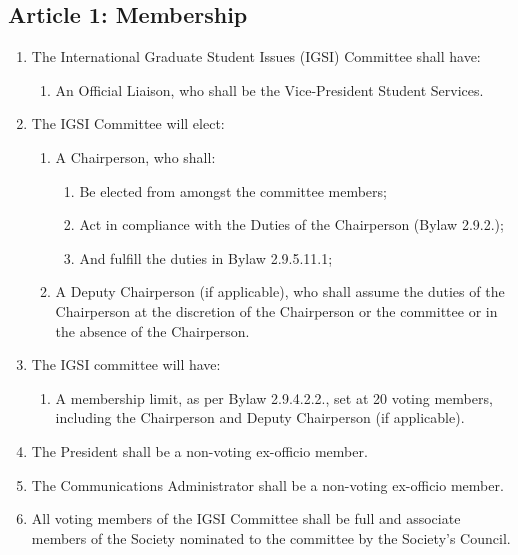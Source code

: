 \subsection{Article 1: Membership}
\begin{enumerate}[label*=\arabic*., align=left]	
\item The International Graduate Student Issues (IGSI) Committee shall have:
\begin{enumerate}[label*=\arabic*., align=left]	
\item An Official Liaison, who shall be the Vice-President Student Services.
\end{enumerate}
\item The IGSI Committee will elect:
\begin{enumerate}[label*=\arabic*., align=left]
\item A Chairperson, who shall:
\begin{enumerate}[label*=\arabic*., align=left]
\item Be elected from amongst the committee members;
\item Act in compliance with the Duties of the Chairperson (Bylaw 2.9.2.);
\item And fulfill the duties in Bylaw 2.9.5.11.1;
\end{enumerate}
\item A Deputy Chairperson (if applicable), who shall assume the duties of the Chairperson at the discretion of the Chairperson or the committee or in the absence of the Chairperson.
\end{enumerate}
\item The IGSI committee will have:
\begin{enumerate}[label*=\arabic*., align=left]
\item A membership limit, as per Bylaw 2.9.4.2.2., set at 20 voting members, including the Chairperson and Deputy Chairperson (if applicable).
\end{enumerate}
\item The President shall be a non-voting ex-officio member.
\item The Communications Administrator shall be a non-voting ex-officio member.
\item All voting members of the IGSI Committee shall be full and associate members of the Society nominated to the committee by the Society’s Council.     
\end{enumerate}


